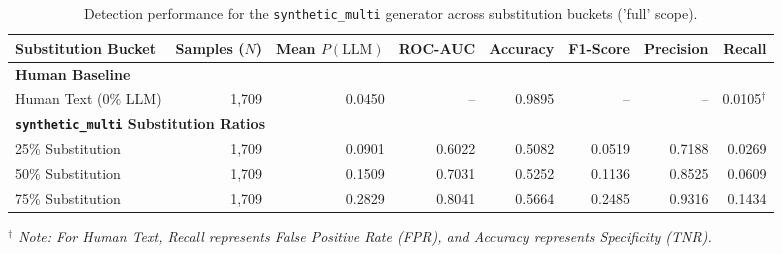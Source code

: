 \begin{table}[htbp]
\centering
\small
\setlength{\tabcolsep}{4pt}
\caption{Detection performance for the \texttt{synthetic\_multi} generator across substitution buckets ('full' scope).}
\label{tab:synthetic_multi_bucket_breakdown}
\begin{tabular}{lrrrrrrr}
\toprule
\textbf{Substitution Bucket} & \textbf{Samples ($N$)} & \textbf{Mean $P(\text{LLM})$} & \textbf{ROC-AUC} & \textbf{Accuracy} & \textbf{F1-Score} & \textbf{Precision} & \textbf{Recall} \\
\midrule
\multicolumn{8}{l}{\textbf{Human Baseline}} \\
Human Text (0\% LLM) & 1,709 & 0.0450 & -- & 0.9895 & -- & -- & 0.0105$^\dagger$ \\
\midrule
\multicolumn{8}{l}{\textbf{\texttt{synthetic\_multi} Substitution Ratios}} \\
25\% Substitution & 1,709 & 0.0901 & 0.6022 & 0.5082 & 0.0519 & 0.7188 & 0.0269 \\
50\% Substitution & 1,709 & 0.1509 & 0.7031 & 0.5252 & 0.1136 & 0.8525 & 0.0609 \\
75\% Substitution & 1,709 & 0.2829 & 0.8041 & 0.5664 & 0.2485 & 0.9316 & 0.1434 \\
\bottomrule
\end{tabular}
\vspace{3pt}
\hfill \footnotesize\textit{$^\dagger$ Note: For Human Text, Recall represents False Positive Rate (FPR), and Accuracy represents Specificity (TNR).}
\end{table}
